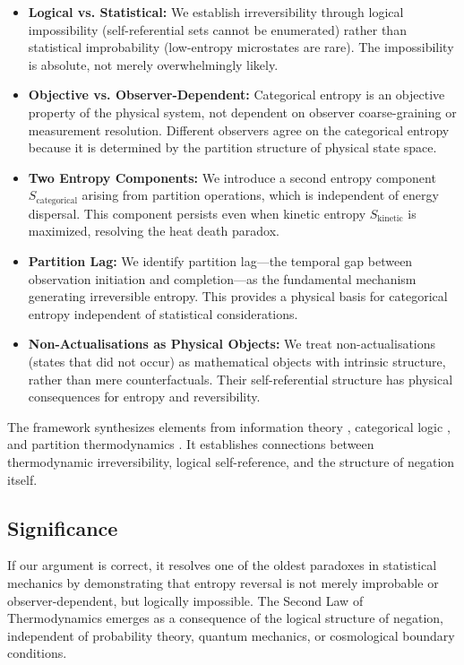 \documentclass[twocolumn,10pt]{article}
\theoremstyle{definition}
\theoremstyle{remark}
\begin{document}
\begin{itemize}
\item \textbf{Logical vs. Statistical:} We establish irreversibility through logical impossibility (self-referential sets cannot be enumerated) rather than statistical improbability (low-entropy microstates are rare). The impossibility is absolute, not merely overwhelmingly likely.

\item \textbf{Objective vs. Observer-Dependent:} Categorical entropy is an objective property of the physical system, not dependent on observer coarse-graining or measurement resolution. Different observers agree on the categorical entropy because it is determined by the partition structure of physical state space.

\item \textbf{Two Entropy Components:} We introduce a second entropy component $S_{\text{categorical}}$ arising from partition operations, which is independent of energy dispersal. This component persists even when kinetic entropy $S_{\text{kinetic}}$ is maximized, resolving the heat death paradox.

\item \textbf{Partition Lag:} We identify partition lag—the temporal gap between observation initiation and completion—as the fundamental mechanism generating irreversible entropy. This provides a physical basis for categorical entropy independent of statistical considerations.

\item \textbf{Non-Actualisations as Physical Objects:} We treat non-actualisations (states that did not occur) as mathematical objects with intrinsic structure, rather than mere counterfactuals. Their self-referential structure has physical consequences for entropy and reversibility.
\end{itemize}

The framework synthesizes elements from information theory \cite{shannon1948}, categorical logic \cite{lawvere1963}, and partition thermodynamics \cite{sachikonye2025partition}. It establishes connections between thermodynamic irreversibility, logical self-reference, and the structure of negation itself.

\subsection{Significance}

If our argument is correct, it resolves one of the oldest paradoxes in statistical mechanics by demonstrating that entropy reversal is not merely improbable or observer-dependent, but logically impossible. The Second Law of Thermodynamics emerges as a consequence of the logical structure of negation, independent of probability theory, quantum mechanics, or cosmological boundary conditions.
\end{document}

